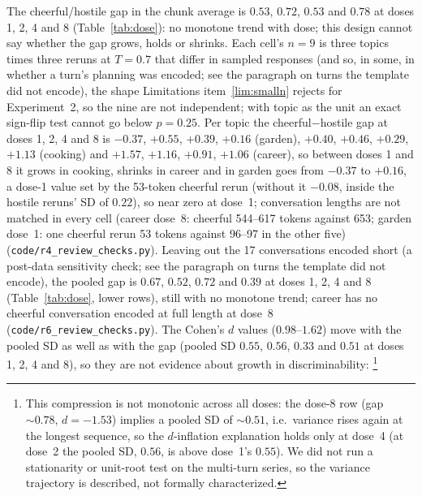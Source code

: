 \documentclass[11pt,a4paper]{article}
\begin{document}
The cheerful/hostile gap in the chunk average is $0.53$, $0.72$, $0.53$
and $0.78$ at doses 1, 2, 4 and 8 (Table~\ref{tab:dose}): no monotone trend with dose; this design cannot say whether the gap grows, holds or shrinks. Each cell's $n{=}9$ is three topics times three reruns at
$T{=}0.7$ that differ in sampled responses (and so, in some, in whether a turn's planning was encoded; see the paragraph on turns the template did not encode), the shape Limitations
item~\ref{lim:smalln} rejects for Experiment~2, so the nine are not independent; with
topic as the unit an exact sign-flip test cannot go below $p{=}0.25$.
Per topic the cheerful$-$hostile gap at doses 1, 2, 4 and 8 is $-0.37$,
$+0.55$, $+0.39$, $+0.16$ (garden), $+0.40$, $+0.46$, $+0.29$, $+1.13$
(cooking) and $+1.57$, $+1.16$, $+0.91$, $+1.06$ (career), so between
doses 1 and 8 it grows in cooking, shrinks in career and in garden goes from $-0.37$ to $+0.16$, a dose-1 value set by the 53-token cheerful rerun (without it $-0.08$, inside the hostile reruns' SD of $0.22$), so near zero at dose~1; conversation lengths are not matched in every cell (career
dose~8: cheerful 544--617 tokens against 653; garden dose~1: one cheerful
rerun 53 tokens against 96--97 in the other five) (\texttt{code/r4\_review\_checks.py}). Leaving out the 17 conversations encoded short (a post-data sensitivity check; see the paragraph on turns the template did not encode), the pooled gap is $0.67$, $0.52$, $0.72$ and $0.39$ at doses 1, 2, 4 and 8 (Table~\ref{tab:dose}, lower rows), still with no monotone trend; career has no cheerful conversation encoded at full length at dose~8 (\texttt{code/r6\_review\_checks.py}). The Cohen's $d$ values ($0.98$--$1.62$) move with the pooled SD as well as with the gap (pooled SD $0.55$, $0.56$, $0.33$ and $0.51$ at doses 1, 2, 4 and 8), so they are not evidence about growth in discriminability:
\footnote{\label{fn:variance}This compression is not monotonic across all doses: the dose-8
row (gap ${\sim}0.78$, $d{=}-1.53$) implies a pooled SD of ${\sim}0.51$,
i.e.\ variance rises again at the longest sequence, so the $d$-inflation explanation holds only at dose~4 (at dose~2 the pooled SD, $0.56$, is above dose~1's $0.55$). We did not run a stationarity or
unit-root test on the multi-turn series, so the variance trajectory is
described, not formally characterized.}
\end{document}
